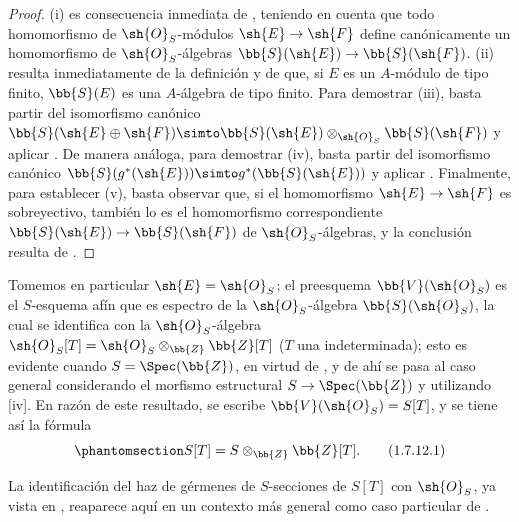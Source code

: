 \documentclass[oneside,10pt]{amsart}
\makeatletter
\newcommand{\ega@arrow}[2]{\mathchoice{#1}{#2}{#2}{#2}}
\renewcommand{\to}{\ega@arrow{\longrightarrow}{\rightarrow}}
\newcommand{\oldpage}[2][]{\marginnote{\normalfont\footnotesize\textbf{#1}~|~#2}\ignorespaces}
\let\EGAOriginalLabel\label
\renewcommand{\label}[1]{\phantomsection\EGAOriginalLabel{#1}}
\makeatother
\begin{document}
\begin{proof}
(i) es consecuencia inmediata de , teniendo en cuenta que todo homomorfismo de $\sh{O}_S$-módulos $\sh{E}\to\sh{F}$ define canónicamente un homomorfismo de $\sh{O}_S$-álgebras $\bb{S}(\sh{E})\to\bb{S}(\sh{F})$.
(ii) resulta inmediatamente de la definición  y de que, si $E$ es un $A$-módulo de tipo finito, $\bb{S}(E)$ es una $A$-álgebra de tipo finito.
Para demostrar (iii), basta partir del isomorfismo canónico $\bb{S}(\sh{E}\oplus\sh{F})\simto\bb{S}(\sh{E})\otimes_{\sh{O}_S}\bb{S}(\sh{F})$  y aplicar .
De manera análoga, para demostrar (iv), basta partir del isomorfismo canónico $\bb{S}(g^*(\sh{E}))\simto g^*(\bb{S}(\sh{E}))$  y aplicar .
Finalmente, para establecer (v), basta observar que, si el homomorfismo $\sh{E}\to\sh{F}$ es sobreyectivo, también lo es el homomorfismo correspondiente $\bb{S}(\sh{E})\to\bb{S}(\sh{F})$ de $\sh{O}_S$-álgebras, y la conclusión resulta de .
\end{proof}

\begin{env}[1.7.12]
\label{II.1.7.12}
Tomemos en particular $\sh{E}=\sh{O}_S$; el preesquema $\bb{V}(\sh{O}_S)$ es el $S$-esquema afín que es espectro de la $\sh{O}_S$-álgebra $\bb{S}(\sh{O}_S)$, la cual se identifica con la $\sh{O}_S$-álgebra $\sh{O}_S[T]=\sh{O}_S\otimes_\bb{Z}\bb{Z}[T]$
\oldpage[II]{18}
($T$ una indeterminada); esto es evidente cuando $S=\Spec(\bb{Z})$, en virtud de , y de ahí se pasa al caso general considerando el morfismo estructural $S\to\Spec(\bb{Z})$ y utilizando [iv].
En razón de este resultado, se escribe $\bb{V}(\sh{O}_S)=S[T]$, y se tiene así la fórmula
\[
\label{II.1.7.12.1}
  S[T]=S\otimes_\bb{Z}\bb{Z}[T].
  \tag{1.7.12.1}
\]

La identificación del haz de gérmenes de $S$-secciones de $S[T]$ con $\sh{O}_S$, ya vista en , reaparece aquí en un contexto más general como caso particular de .
\end{env}
\end{document}

